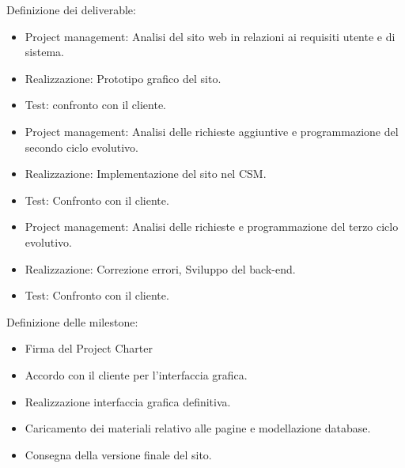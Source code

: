 \documentclass{article}
\begin{document}
	\begin{flushleft}

		Definizione dei deliverable:

		\begin{itemize}

			\item Project management: Analisi del sito web in relazioni ai requisiti utente e di sistema.

			\item Realizzazione: Prototipo grafico del sito.

			\item Test: confronto con il cliente.
			
			\item Project management: Analisi delle richieste aggiuntive e programmazione del secondo ciclo evolutivo.

			\item Realizzazione: Implementazione del sito nel CSM.
			
			\item Test: Confronto con il cliente.
		
			\item Project management: Analisi delle richieste e programmazione del terzo ciclo evolutivo.

			\item Realizzazione: Correzione errori, Sviluppo del back-end.
			
			\item Test: Confronto con il cliente.				

		\end{itemize}

		

		Definizione delle milestone:

		\begin{itemize}
            
            \item Firma del Project Charter
            
			\item Accordo con il cliente per l'interfaccia grafica.

			\item Realizzazione interfaccia grafica definitiva.

			\item Caricamento dei materiali relativo alle pagine e modellazione database.

			\item Consegna della versione finale del sito.


\end{itemize}
\end{flushleft}
\end{document}
